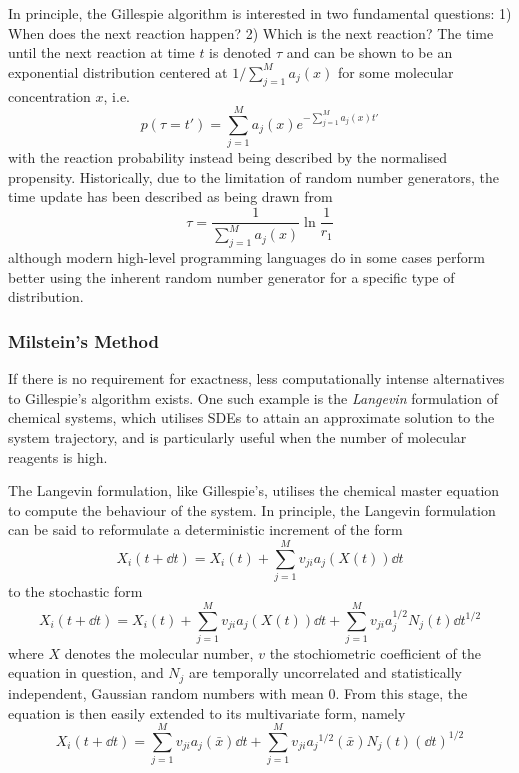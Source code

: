 In principle, the Gillespie algorithm is interested in two fundamental
questions: 1) When does the next reaction happen? 2) Which is the next reaction?
The time until the next reaction at time $t$ is denoted $\tau$ and can be shown
to be an exponential distribution centered  
at $1 / \sum_{j=1}^{M}a_j(x)$ for some molecular concentration $x$, i.e.
\begin{equation}
  p(\tau = t') = \sum_{j=1}^M a_j(x)e^{-\sum_{j=1}^M a_j(x)t'}
  \label{eq:gill:time}
\end{equation}
with the reaction probability instead being described by the normalised
propensity. Historically, due to the limitation of random number generators, the
time update has been described as being drawn from 
\begin{equation} 
  \displaystyle
  \tau = \dfrac{1}{\sum_{j=1}^M a_j(x)} \ln\dfrac{1}{r_1}
  \label{eq:gill_time_update}
\end{equation}
although modern high-level programming languages do in some cases perform better using the
inherent random number generator for a specific type of distribution. \CITE

\subsubsection{Milstein's Method}
If there is no requirement for exactness, less computationally intense
alternatives to Gillespie's algorithm exists. One such example is the
\textit{Langevin} formulation of chemical systems, which utilises SDEs to
attain an approximate solution to the system trajectory, and is particularly
useful when the number of molecular reagents is high. 

The Langevin formulation, like Gillespie's, utilises the chemical master
equation to compute the behaviour of the system. In principle, the Langevin
formulation can be said to reformulate a deterministic increment of the form
\begin{equation}
  X_i(t + \dd{t}) = X_{i}(t) + \sum_{j=1}^M
  v_{ji}a_j(X(t))\dd{t}
  \label{eq:deterministic}
\end{equation}
to the stochastic form
\begin{equation}
  X_i(t + \dd{t}) = X_{i}(t) + \sum_{j=1}^M
  v_{ji}a_j(X(t))\dd{t} + \sum_{j=1}^M
  v_{ji}a_j^{1/2}N_j(t)\dd{t}^{1/2}
  \label{eq:stoch}
\end{equation}
where $X$ denotes the molecular number, $v$ the stochiometric coefficient of the
equation in question, and $N_j$ are temporally uncorrelated and statistically
independent, Gaussian random numbers with mean 0. From this stage, the equation
is then easily extended to its multivariate form, namely
\begin{equation}
  X_i(t + \dd{t}) = \sum_{j=1}^Mv_{ji}a_j(\bar x) \dd{t} +
  \sum_{j=1}^M v_{ji}{a_j}^{1/2}(\bar x) N_j(t) \left( \dd t \right)^{1/2}
  \label{eq:stoch_multi}
\end{equation}

